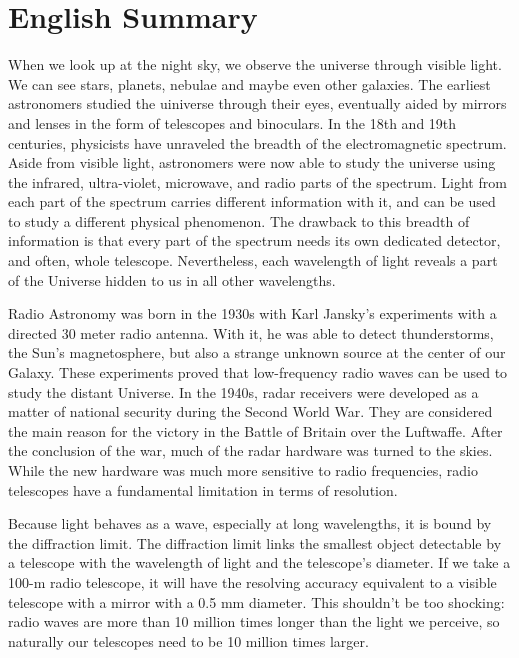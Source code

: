 \cleardoublepage
{}
 

\chapter*{English Summary}\label{ch:summary_eng}
When we look up at the night sky, we observe the universe through visible light. We can see stars, planets, nebulae and maybe even other galaxies. The earliest astronomers studied the uiniverse through their eyes, eventually aided by mirrors and lenses in the form of telescopes and binoculars. In the 18th and 19th centuries, physicists have unraveled the breadth of the electromagnetic spectrum. Aside from visible light, astronomers were now able to study the universe using the infrared, ultra-violet, microwave, and radio parts of the spectrum. Light from each part of the spectrum carries different information with it, and can be used to study a different physical phenomenon. The drawback to this breadth of information is that every part of the spectrum needs its own dedicated detector, and often, whole telescope. Nevertheless, each wavelength of light reveals a part of the Universe hidden to us in all other wavelengths. 

Radio Astronomy was born in the 1930s with Karl Jansky's experiments with a directed 30 meter radio antenna. With it, he was able to detect thunderstorms, the Sun's magnetosphere, but also a strange unknown source at the center of our Galaxy. These experiments proved that low-frequency radio waves can be used to study the distant Universe. In the 1940s, radar receivers were developed as a matter of national security during the Second World War. They are considered the main reason for the victory in the Battle of Britain over the Luftwaffe. After the conclusion of the war, much of the radar hardware was turned to the skies. While the new hardware was much more sensitive to radio frequencies, radio telescopes have a fundamental limitation in terms of resolution. 

Because light behaves as a wave, especially at long wavelengths, it is bound by the diffraction limit. The diffraction limit links the smallest object detectable by a telescope with the wavelength of light and the telescope's diameter. If we take a 100-m radio telescope, it will have the resolving accuracy equivalent to a visible telescope with a mirror with a 0.5 mm diameter. This shouldn't be too shocking: radio waves are more than 10 million times longer than the light we perceive, so naturally our telescopes need to be 10 million times larger. 

